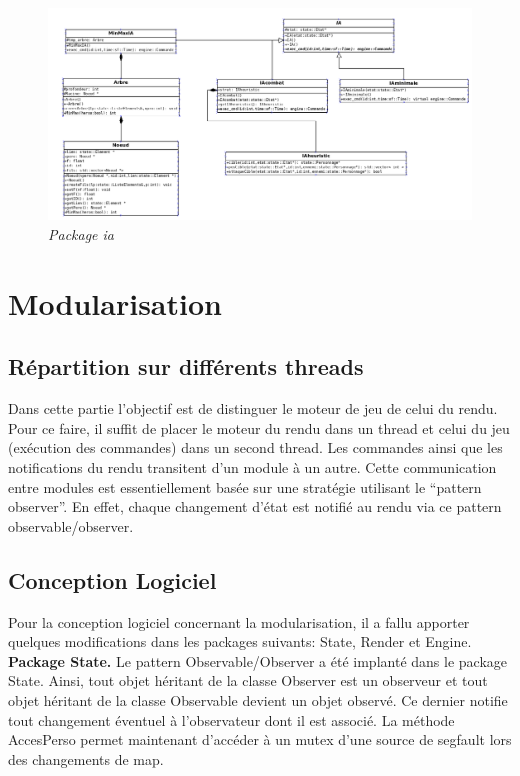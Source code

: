 \documentclass[11pt, a4paper]{article}
\begin{document}
\begin{figure}[H]
  \centering
  \includegraphics[scale=0.45]{img/ia.png}
  \caption{\emph{Package ia}}
\end{figure}

\section{Modularisation}
  \subsection{Répartition sur différents threads}
  Dans cette partie l'objectif est de distinguer le moteur de jeu de celui du rendu. Pour ce faire, il suffit de placer le moteur du rendu dans un thread et celui du jeu (exécution des commandes) dans un second thread.
  Les commandes ainsi que les notifications du rendu transitent d'un module à un autre. Cette communication entre modules est essentiellement basée sur une stratégie utilisant le ``pattern observer''. En effet, chaque changement d'état est notifié au rendu via ce pattern observable/observer.

  \subsection{Conception Logiciel}
  Pour la conception logiciel concernant la modularisation, il a fallu apporter quelques modifications dans les packages suivants: State, Render et Engine.\\
  
  \textbf{Package State. } Le pattern Observable/Observer a été implanté dans le package State. Ainsi, tout objet héritant de la classe Observer est un observeur et tout objet héritant de la classe Observable devient un objet observé. Ce dernier notifie tout changement éventuel à l'observateur dont il est associé.
  La méthode AccesPerso permet maintenant d'accéder à un mutex d'une source de segfault lors des changements de map.
  
\end{document}
